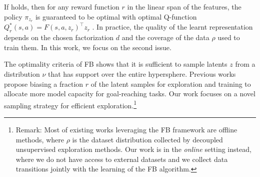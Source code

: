 If  holds, then for any reward function $r$ in the linear span of the features, the policy $\pi_{z_r}$ is guaranteed to be optimal with optimal Q-function $Q^*_r(s,a) = F(s,a,z_r)^\top z_r$ \citep{touati2021learning}. In practice, the quality of the learnt representation depends on the chosen factorization $d$ and the coverage of the data $\rho$ used to train them.  In this work, we focus on the second issue.




The optimality criteria of FB \citep{touati2021learning} shows that it is sufficient to sample latents $z$ from a distribution $\nu$ that has support over the entire hypersphere. Previous works \citep{tirinzoni2025zeroshot} propose biasing a fraction $r$ of the latent samples for exploration and training to allocate more model capacity for goal-reaching tasks. Our work focuses on a novel sampling strategy for efficient exploration.\footnote{Remark: Most of existing works leveraging the FB framework \citep{touati2023does, cetin25, pirotta2024fast} are offline methods, where $\rho$ is the dataset distribution collected by decoupled unsupervised exploration methods. Our work is in the \textit{online} setting instead, where we do not have access to external datasets and we collect data transitions jointly with the learning of the FB algorithm.}

